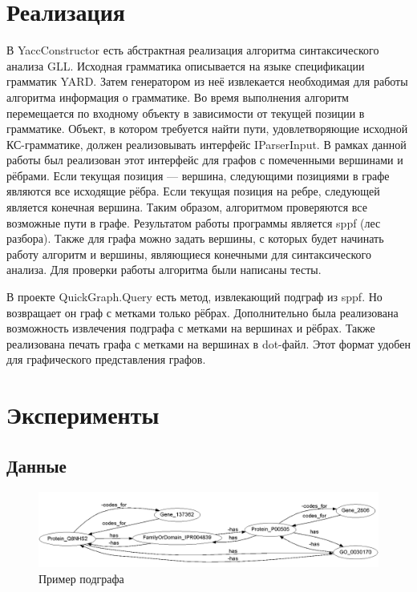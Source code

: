 \documentclass[14pt]{matmex-diploma}
\begin{document}
\section{Реализация}
В YaccConstructor есть абстрактная реализация алгоритма синтаксического анализа GLL. Исходная грамматика описывается на языке спецификации грамматик YARD. Затем генератором из неё извлекается необходимая для работы алгоритма информация о грамматике. Во время выполнения алгоритм перемещается по входному объекту в зависимости от текущей позиции в грамматике. Объект, в котором требуется найти пути, удовлетворяющие исходной КС-грамматике, должен реализовывать интерфейс IParserInput. В рамках данной работы был реализован этот интерфейс для графов с помеченными вершинами и рёбрами. Если текущая позиция --- вершина, следующими позициями в графе являются все исходящие рёбра. Если текущая позиция на ребре, следующей является конечная вершина. Таким образом, алгоритмом проверяются все возможные пути в графе. Результатом работы программы является sppf (лес разбора). Также для графа можно задать вершины, с которых будет начинать работу алгоритм и вершины, являющиеся конечными для синтаксического анализа. Для проверки работы алгоритма были написаны тесты.

В проекте QuickGraph.Query есть метод, извлекающий подграф из sppf. Но возвращает он граф с метками только рёбрах. Дополнительно была реализована возможность извлечения подграфа с метками на вершинах и рёбрах. Также реализована печать графа с метками на вершинах в dot-файл. Этот формат удобен для графического представления графов.

\section{Эксперименты}
\subsection{Данные}

\begin{figure}
\centering
\includegraphics[width=16cm]{images/subgraph1.png}
\caption{Пример подграфа}
\label{subgraph}
\end{figure}
\end{document}
